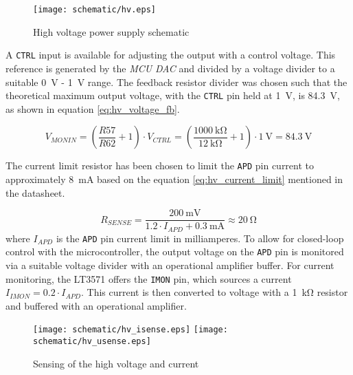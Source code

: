 \FloatBarrier
\begin{figure}[htp!]
    \centering
    \texttt{[image: schematic/hv.eps]}
    \caption{High voltage power supply schematic}
    \label{fig:schem_hv}
\end{figure}
\FloatBarrier
A \verb|CTRL| input is available for adjusting the output with a control voltage. This reference is generated by the \emph{MCU} \emph{DAC} and divided by a voltage divider to a suitable \SI{0}{V} - \SI{1}{V} range. The feedback resistor divider was chosen such that the theoretical maximum output voltage, with the \verb|CTRL| pin held at \SI{1}{\volt}, is \SI{84.3}{\volt}, as shown in equation \ref{eq:hv_voltage_fb}. \cite{lt3571_datasheet}

\begin{equation}
V_{MONIN} = (\frac{R57}{R62} + 1) \cdot V_{CTRL} = (\frac{\SI{1000}{\kilo\ohm}}{\SI{12}{\kilo\ohm}} + 1) \cdot \SI{1}{\volt} = \SI{84.3}{\volt}
\label{eq:hv_voltage_fb}
\end{equation}


The current limit resistor has been chosen to limit the \verb|APD| pin current to approximately \SI{8}{\milli\ampere} based on the equation \ref{eq:hv_current_limit} mentioned in the datasheet. \cite{lt3571_datasheet}

\begin{equation}
R_{SENSE} = \frac{\SI{200}{\milli\volt}}{1.2 \cdot I_{APD} + \SI{0.3}{\milli\ampere}} \approx \SI{20}{\ohm}
\label{eq:hv_current_limit}
\end{equation}
%
where $I_{APD}$ is the \verb|APD| pin current limit in milliamperes.
To allow for closed-loop control with the microcontroller, the output voltage on the \verb|APD| pin is monitored via a suitable voltage divider with an operational amplifier buffer. For current monitoring, the LT3571 offers the \verb|IMON| pin, which sources a current $I_{IMON} = 0.2 \cdot I_{APD}$. \cite{lt3571_datasheet} This current is then converted to voltage with a \SI{1}{\kilo\ohm} resistor and buffered with an operational amplifier.

\FloatBarrier
\begin{figure}[htp!]
    \centering
    \texttt{[image: schematic/hv\_isense.eps]}
    \texttt{[image: schematic/hv\_usense.eps]}
    \caption{Sensing of the high voltage and current}
    \label{fig:schem_hvsense}
\end{figure}
\FloatBarrier

